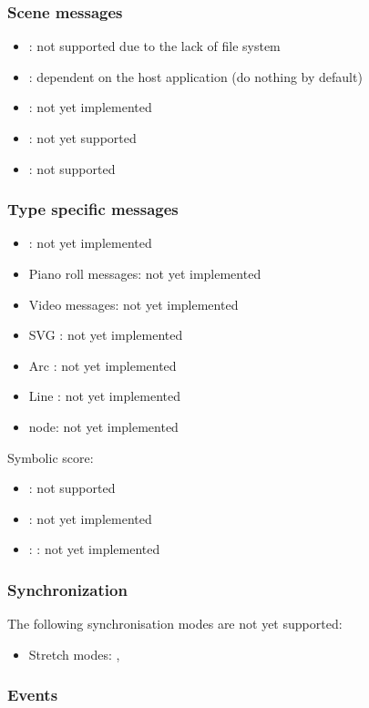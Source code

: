 \documentclass[a4paper,twoside]{article}
\newcommand{\subsublevel}[1]	{\subsubsection{#1}}
\begin{document}
\subsublevel{Scene messages}
\label{websceneMessages}

\begin{itemize}
\item {}: not supported due to the lack of file system
\item {}: dependent on the host application (do nothing by default)
\item {}: not yet implemented
\item {}: not yet supported
\item {} : not supported
\end{itemize}

\subsublevel{Type specific messages}
\label{webtypesMessages}

\begin{itemize}
\item {}: not yet implemented
\item Piano roll messages: not yet implemented
\item Video  messages: not yet implemented
\item SVG : not yet implemented
\item Arc : not yet implemented
\item Line : not yet implemented
\item {} node: not yet implemented
\end{itemize}

Symbolic score:
\begin{itemize}
\item {} : not supported
\item {}: not yet implemented
\item {}:  : not yet implemented
\end{itemize}

\subsublevel{Synchronization}
\label{webSynchronization}

The following synchronisation modes are not yet supported:
\begin{itemize}
\item Stretch modes: , 
\end{itemize}

\subsublevel{Events}
\label{webEvents}
\end{document}
